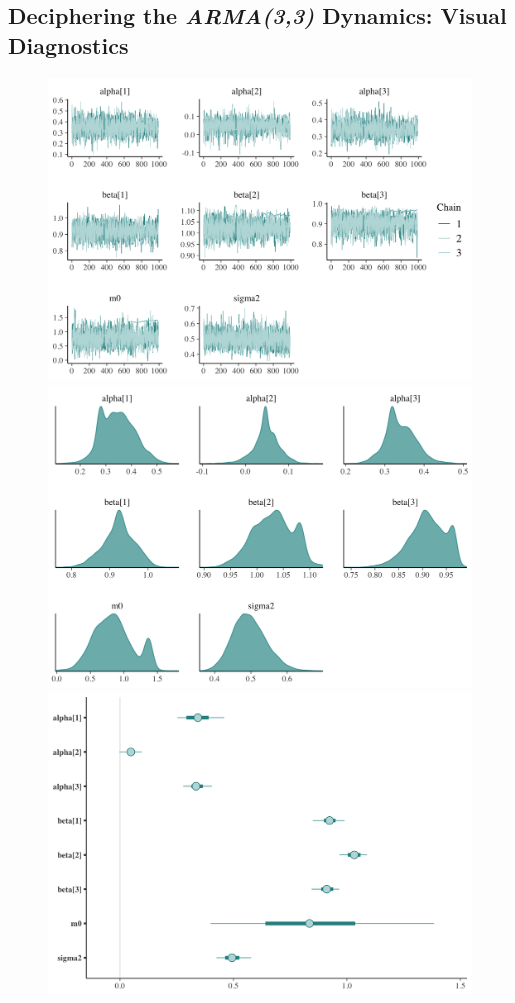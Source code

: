 \documentclass{Configuration_Files/PoliMi3i_thesis}
\begin{document}
\subsection{Deciphering the \textbf{\textit{ARMA(3,3)}} Dynamics: Visual Diagnostics}
\begin{figure}[H]
    \centering
    \includegraphics[width=0.62\linewidth]{ARMA-trace.png}
    \vspace{0.5em}
    
    \includegraphics[width=0.62\linewidth]{ARMA-density.png}
    \vspace{0.5em}
    
    \includegraphics[width=0.62\linewidth]{ARMA-interval.png}
\end{figure}
\end{document}
